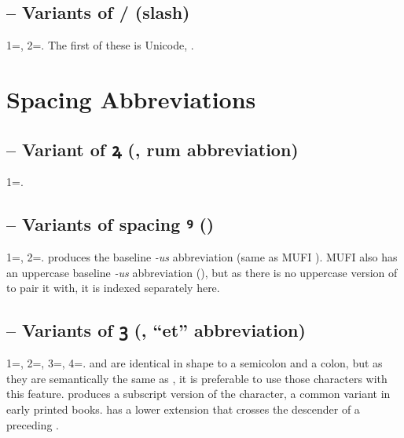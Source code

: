 \subsection{ – Variants of / (slash)}
1=, 2=. The first of these is Unicode, .

\section{Spacing Abbreviations}
\subsection{ – Variant of ꝝ (, rum
abbreviation)}
1=.

\subsection{ – Variants of spacing ꝰ ()}
1=, 2=.  produces the baseline \textit{{}-us} abbreviation (same as MUFI
). MUFI also has an uppercase baseline \textit{{}-us} abbreviation (), but as there is no uppercase version
of  to pair it with, it is indexed separately here.

\subsection{ – Variants of ꝫ (, “et” abbreviation)}
1=, 2=, 3=, 4=. \textSourceText{[1]} and \textSourceText{[3]} are
identical in shape to a semicolon and a colon, but as they are semantically the same as ,
it is preferable to use those
characters with this feature. \textSourceText{[2]} produces a subscript version of
the character, a common variant in early printed books. \textSourceText{[4]} has a lower extension that
crosses the descender of a preceding .


